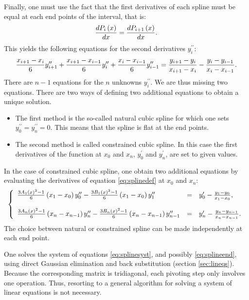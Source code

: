 \documentclass[twoside]{book}
\begin{document}
Finally, one must use the fact that the first derivatives of each
spline must be equal at each end points of the interval, that is:
\begin{equation}
 {dP_i\left(x\right)\over dx}={dP_{i+1}\left(x\right)\over dx}.
\end{equation}
This yields the following equations for the second derivatives
$y^{\prime\prime}_i$:
\begin{equation}
\label{eq:splinesyst}
  {x_{i+1}-x_i \over 6}y^{\prime\prime}_{i+1}
  + {x_{i+1}-x_{i-1} \over  6}y^{\prime\prime}_i
  + {x_i-x_{i-1} \over 6}y^{\prime\prime}_{i-1}=
  {y_{i+1}-y_i \over x_{i+1}-x_i} - {y_i-y_{i-1} \over  x_i-x_{i-1}}.
\end{equation}
There are $n-1$ equations for the $n$ unknowns
$y^{\prime\prime}_i$. We are thus missing two equations. There are
two ways of defining two additional equations to obtain a unique
solution.
\begin{itemize}
  \item The first method is the so-called natural cubic spline for which
one sets $y^{\prime\prime}_0=y^{\prime\prime}_n=0$. This means
that the spline is flat at the end points.
  \item The second method is called constrained cubic spline. In this case the
first derivatives of the function at $x_0$ and $x_n$,
$y^{\prime}_0$ and $y^{\prime}_n$, are set to given values.
\end{itemize}

In the case of constrained cubic spline, one obtain two additional
equations by evaluating the derivatives of equation
\ref{eq:splinedef} at $x_0$ and $x_n$:
\begin{equation}
\label{eq:splineend}
 \left\{
  \begin{array}{lcl}
    {3A_1\left(x\right)^2-1\over 6}\left(x_1-x_0\right) y^{\prime\prime}_0 -
    {3B_1\left(x\right)^2-1\over 6}\left(x_1-x_0\right) y^{\prime\prime}_1 & = &
    y^{\prime}_0 - {y_1-y_0 \over x_1-x_0},
    \\*[3 ex]
    {3A_n\left(x\right)^2-1\over 6}\left(x_n-x_{n-1}\right) y^{\prime\prime}_n -
    {3B_n\left(x\right)^2-1\over 6}\left(x_n-x_{n-1}\right) y^{\prime\prime}_{n-1} & = &
    y^{\prime}_n - {y_n-y_{n-1} \over x_n-x_{n-1}}.
  \end{array} \right.
\end{equation}
The choice between natural or constrained spline can be made
independently at each end point.

One solves the system of equations \ref{eq:splinesyst}, and
possibly \ref{eq:splineend}, using direct Gaussian elimination and
back substitution (\cf section \ref{sec:lineqs}). Because the
corresponding matrix is tridiagonal, each pivoting step only
involves one operation. Thus, resorting to a general algorithm for
solving a system of linear equations is not necessary.
\end{document}
